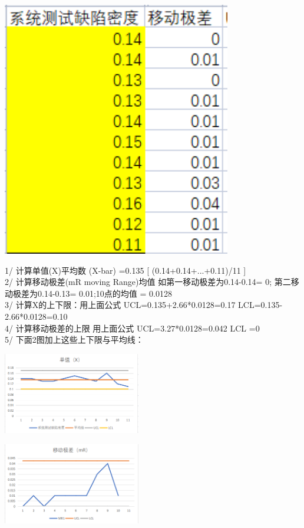 \includegraphics[width=10cm]{微信截图_20210929131748.png}

1/ 计算单值(X)平均数 (X-bar) =0.135 {[} (0.14+0.14+...+0.11)/11 {]}\\
2/ 计算移动极差(mR moving Range)均值 如第一移动极差为0.14-0.14= 0;
第二移动极差为0.14-0.13= 0.01;10点的均值 = 0.0128\\
3/ 计算X的上下限：用上面公式 UCL=0.135+2.66*0.0128=0.17
LCL=0.135-2.66*0.0128=0.10\\
4/ 计算移动极差的上限 用上面公式 UCL=3.27*0.0128=0.042 LCL =0\\
5/ 下面2图加上这些上下限与平均线：


\includegraphics[width=6cm]{微信截图_20210927084548.png}


\includegraphics[width=6cm]{微信截图_20210927084434.png}


